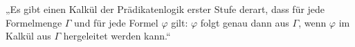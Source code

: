 

\begin{theorem}
	„Es gibt einen Kalkül der Prädikatenlogik erster Stufe derart, dass für jede Formelmenge
\( \Gamma \) und für jede Formel
\( \varphi \) gilt:
\( \varphi \) folgt genau dann aus
\( \Gamma \), wenn
\( \varphi \) im Kalkül aus
\( \Gamma \)  hergeleitet werden kann.“
\end{theorem}

